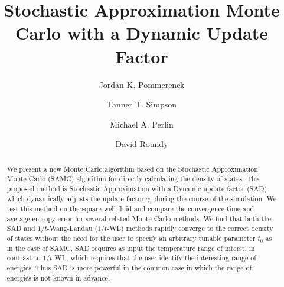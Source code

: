 \documentclass[letterpaper,twocolumn,amsmath,amssymb,pre,aps,10pt]{revtex4-1}
\begin{document}
\title{Stochastic Approximation Monte Carlo with a Dynamic Update
Factor
}

\author{Jordan K. Pommerenck} \author{Tanner T. Simpson}
\author{Michael A. Perlin} \author{David Roundy}

\begin{abstract}
  We present a new Monte Carlo algorithm based on the Stochastic
  Approximation Monte Carlo (SAMC) algorithm for directly calculating
  the density of states. The proposed method is Stochastic
  Approximation with a Dynamic update factor (SAD)
  which dynamically adjusts the update factor $\gamma_t$ during the course of
  the simulation. We test this method on the square-well fluid and
  compare the convergence time and average entropy error for several
  related
  Monte Carlo methods. We find that both the SAD and $1/t$-Wang-Landau ($1/t$-WL)
  methods rapidly converge to the
  correct density of states without the need for the user to specify an
  arbitrary tunable parameter $t_0$ as in the case of SAMC.  SAD requires
  as input the temperature range of interst, in contrast to
  $1/t$-WL, which requires that the user identify the interesting range
  of energies.  Thus SAD is more powerful in the common case in which the range
  of energies is not known in advance.
\end{abstract}

\maketitle
\end{document}

